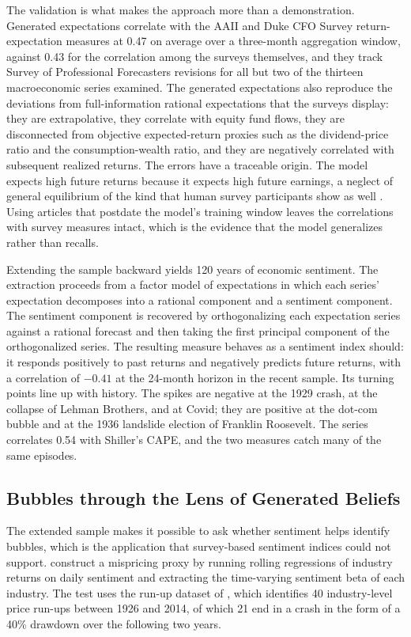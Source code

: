 The validation is what makes the approach more than a demonstration. Generated expectations correlate with the AAII and Duke CFO Survey return-expectation measures at 0.47 on average over a three-month aggregation window, against 0.43 for the correlation among the surveys themselves, and they track Survey of Professional Forecasters revisions for all but two of the thirteen macroeconomic series examined. The generated expectations also reproduce the deviations from full-information rational expectations that the surveys display: they are extrapolative, they correlate with equity fund flows, they are disconnected from objective expected-return proxies such as the dividend-price ratio and the consumption-wealth ratio, and they are negatively correlated with subsequent realized returns. The errors have a traceable origin. The model expects high future returns because it expects high future earnings, a neglect of general equilibrium of the kind that human survey participants show as well \citep{andre2026}. Using articles that postdate the model's training window leaves the correlations with survey measures intact, which is the evidence that the model generalizes rather than recalls.

Extending the sample backward yields 120 years of economic sentiment. The extraction proceeds from a factor model of expectations in which each series' expectation decomposes into a rational component and a sentiment component. The sentiment component is recovered by orthogonalizing each expectation series against a rational forecast and then taking the first principal component of the orthogonalized series. The resulting measure behaves as a sentiment index should: it responds positively to past returns and negatively predicts future returns, with a correlation of $-0.41$ at the 24-month horizon in the recent sample. Its turning points line up with history. The spikes are negative at the 1929 crash, at the collapse of Lehman Brothers, and at Covid; they are positive at the dot-com bubble and at the 1936 landslide election of Franklin Roosevelt. The series correlates 0.54 with Shiller's CAPE, and the two measures catch many of the same episodes.

\subsection{Bubbles through the Lens of Generated Beliefs}

The extended sample makes it possible to ask whether sentiment helps identify bubbles, which is the application that survey-based sentiment indices could not support. \citet{bybee2025} construct a mispricing proxy by running rolling regressions of industry returns on daily sentiment and extracting the time-varying sentiment beta of each industry. The test uses the run-up dataset of \citet{greenwoodshleiferyou2019}, which identifies 40 industry-level price run-ups between 1926 and 2014, of which 21 end in a crash in the form of a 40\% drawdown over the following two years.

